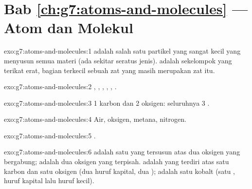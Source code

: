\section*{Bab \ref{ch:g7:atoms-and-molecules} --- Atom dan Molekul}

\begin{solution}{exo:g7:atoms-and-molecules:1}
 adalah salah satu partikel yang sangat kecil yang menyusun semua
materi (ada sekitar seratus jenis).  adalah sekelompok  yang
terikat erat, bagian terkecil sebuah zat yang masih merupakan zat itu.
\end{solution}

\begin{solution}{exo:g7:atoms-and-molecules:2}
, , , , , .
\end{solution}

\begin{solution}{exo:g7:atoms-and-molecules:3}
1  karbon dan 2  oksigen: seluruhnya 3 .
\end{solution}

\begin{solution}{exo:g7:atoms-and-molecules:4}
Air, oksigen, metana, nitrogen.
\end{solution}

\begin{solution}{exo:g7:atoms-and-molecules:5}
.
\end{solution}

\begin{solution}{exo:g7:atoms-and-molecules:6}
 adalah satu  yang tersusun atas dua  oksigen yang
bergabung;  adalah dua  oksigen yang terpisah.  adalah
 yang terdiri atas satu  karbon dan satu  oksigen (dua
huruf kapital, dua );  adalah satu  kobalt (satu
, huruf kapital lalu huruf kecil).
\end{solution}

